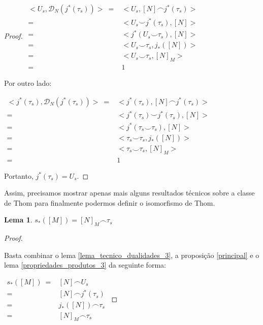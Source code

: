 \documentclass[12pt,oneside]{book} %
\newtheorem{lem}    {\hspace{0.5cm}Lema}[chapter]
\newcommand{\ccup}{\smile}
\newcommand{\ccap}{\frown}
\begin{document}
\begin{proof}
	$\begin{array}{rl}
		<U_{s},\mathcal{D}_{N}(j^{*}(\tau_{s}))> \ = & <U_{s},[N]\ccap j^{*}(\tau_{s})> \\
		= & <U_{s}\ccup j^{*}(\tau_{s}),[N]> \\
		= & <j^{*}(U_{s}\ccup\tau_{s}),[N]> \\
		= & <U_{s}\ccup\tau_{s},j_{*}([N])> \\
		= & <U_{s}\ccup\tau_{s},[N]_{M}> \\
		= & 1
	\end{array}$ \newline
	
	\par Por outro lado: \newline
	
	$\begin{array}{rl}
		<j^{*}(\tau_{s}),\mathcal{D}_{N}(j^{*}(\tau_{s}))> \ = & <j^{*}(\tau_{s}),[N]\ccap j^{*}(\tau_{s})> \\
		= & <j^{*}(\tau_{s})\ccup j^{*}(\tau_{s}),[N]> \\
		= & <j^{*}(\tau_{s}\ccup\tau_{s}),[N]> \\
		= & <\tau_{s}\ccup\tau_{s},j_{*}([N])> \\
		= & <\tau_{s}\ccup\tau_{s},[N]_{M}> \\
		= & 1
	\end{array}$ \newline
	
	\par Portanto, $j^{*}(\tau_{s})=U_{s}$.
	
\end{proof}

\par Assim, precisamos mostrar apenas mais alguns resultados técnicos sobre a classe de Thom para finalmente podermos definir o isomorfismo de Thom.

\begin{lem}\label{lema_tecnico_dualidades_2}
	$s_{*}([M])=[N]_{M}\ccap \tau_{s}$
\end{lem}
\begin{proof}
	
	\
	
	\par Basta combinar o lema \ref{lema_tecnico_dualidades_3}, a proposição \ref{principal} e o lema \ref{propriedades_produtos_3} da seguinte forma:\newline
	
	$ \begin{array}{rl}
		s_{*}([M]) \ = & [N]\ccap U_{s} \\
		= & [N]\ccap j^{*}(\tau_{s}) \\
		= & j_{*}([N])\ccap\tau_{s} \\
		= & [N]_{M}\ccap \tau_{s}
	\end{array} $
	
\end{proof}
\end{document}
